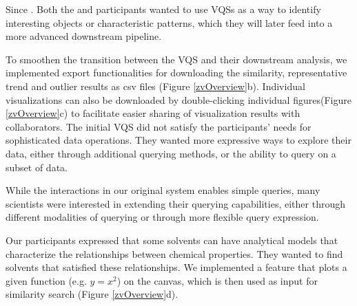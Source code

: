  Since . Both the \astro and \bio participants wanted to use VQSs as a way to identify interesting objects or characteristic patterns, which they will later feed into a more advanced downstream pipeline. 
\par To smoothen the transition between the VQS and their downstream analysis, we implemented export functionalities for downloading the similarity, representative trend and outlier results as csv files (Figure \ref{zvOverview}b). Individual visualizations can also be downloaded by double-clicking individual figures(Figure \ref{zvOverview}c) to facilitate easier sharing of visualization results with collaborators. 
The initial VQS did not satisfy the participants' needs for sophisticated data operations. They wanted more expressive ways to explore their data, either through additional querying methods, or the ability to query on a subset of data.
\par While the interactions in our original system enables simple queries, many scientists were interested in extending their querying capabilities, either through different modalities of querying or through more flexible query expression.  

 Our \matsci participants expressed that some solvents can have analytical models that characterize the relationships between chemical properties. They wanted to find solvents that satisfied these relationships. We implemented a feature that plots a given function (e.g. $y=x^2$) on the canvas, which is then used as input for similarity search (Figure \ref{zvOverview}d).

